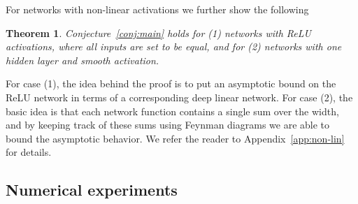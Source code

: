 \documentclass[english]{article}
\newtheorem{thm}{Theorem}
\begin{document}
For networks with non-linear activations we further show the following
\begin{thm}\label{thm:nonlin}
  Conjecture~\ref{conj:main} holds for (1) networks with ReLU activations, where all inputs are set to be equal, and for (2) networks with one hidden layer and smooth activation.
\end{thm}
For case (1), the idea behind the proof is to put an asymptotic bound on the ReLU network in terms of a corresponding deep linear network.
For case (2), the basic idea is that each network function contains a single sum over the width, and by keeping track of these sums using Feynman diagrams we are able to bound the asymptotic behavior.
We refer the reader to Appendix~\ref{app:non-lin} for details. 

\subsection{Numerical experiments}
\end{document}
